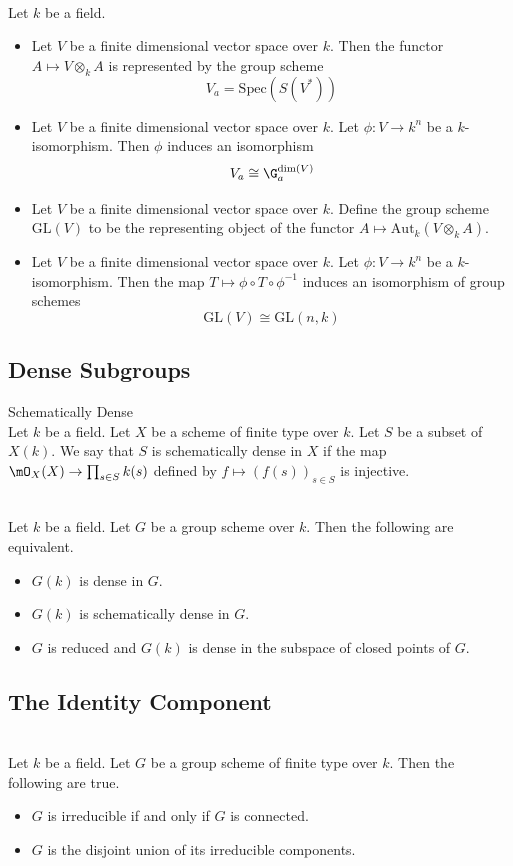 \documentclass[a4paper]{article}
\begin{document}
\begin{eg}{}{}\\
Let $k$ be a field. 
\begin{itemize}
\item Let $V$ be a finite dimensional vector space over $k$. Then the functor $A\mapsto V\otimes_kA$ is represented by the group scheme $$V_a=\text{Spec}(S(V^\ast))$$
\item Let $V$ be a finite dimensional vector space over $k$. Let $\phi:V\to k^n$ be a $k$-isomorphism. Then $\phi$ induces an isomorphism $$V_a\cong\G_a^{\dim(V)}$$
\item Let $V$ be a finite dimensional vector space over $k$. Define the group scheme $\text{GL}(V)$ to be the representing object of the functor $A\mapsto\text{Aut}_k(V\otimes_kA)$. 
\item Let $V$ be a finite dimensional vector space over $k$. Let $\phi:V\to k^n$ be a $k$-isomorphism. Then the map $T\mapsto\phi\circ T\circ\phi^{-1}$ induces an isomorphism of group schemes $$\text{GL}(V)\cong\text{GL}(n,k)$$
\end{itemize}
\end{eg}

\subsection{Dense Subgroups}
\begin{defn}{Schematically Dense}{}\\
Let $k$ be a field. Let $X$ be a scheme of finite type over $k$. Let $S$ be a subset of $X(k)$. We say that $S$ is schematically dense in $X$ if the map $\mO_X(X)\to\prod_{s\in S}k(s)$ defined by $f\mapsto(f(s))_{s\in S}$ is injective. 
\end{defn}

\begin{prp}{}{}\\
Let $k$ be a field. Let $G$ be a group scheme over $k$. Then the following are equivalent. 
\begin{itemize}
\item $G(k)$ is dense in $G$. 
\item $G(k)$ is schematically dense in $G$. 
\item $G$ is reduced and $G(k)$ is dense in the subspace of closed points of $G$. 
\end{itemize}
\end{prp}

\subsection{The Identity Component}
\begin{lmm}{}{}\\
Let $k$ be a field. Let $G$ be a group scheme of finite type over $k$. Then the following are true. 
\begin{itemize}
\item $G$ is irreducible if and only if $G$ is connected. 
\item $G$ is the disjoint union of its irreducible components. 
\end{itemize}
\end{lmm}
\end{document}
